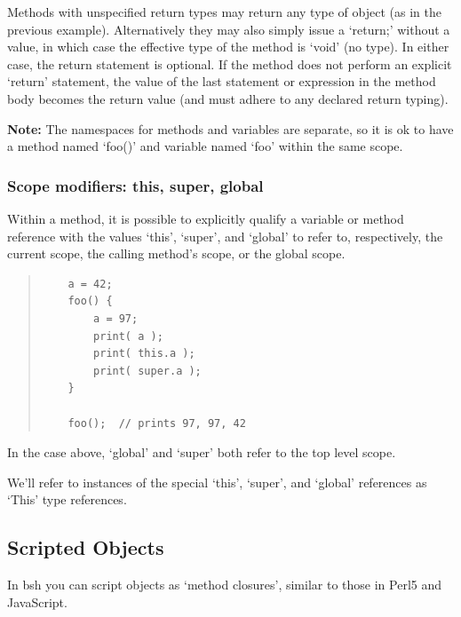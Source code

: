 \documentclass[twoside,11pt]{article}
\renewcommand{\_}{\texttt{\symbol{95}}}
\begin{document}
Methods with unspecified return types may return any type of object (as in
the previous example).
Alternatively they may also simply issue a `return;' without a value, in
which case the effective type of the method is `void' (no type).  In
either case, the return statement is optional.  If the method does not
perform an explicit `return' statement, the value of the last statement or
expression in the method body becomes the return value (and must adhere
to any declared return typing).

\textbf{Note:}
The namespaces for methods and variables are separate, so
it is ok to have a method named `foo()' and variable named `foo' within
the same scope.

\subsubsection{Scope modifiers: this, super, global}
Within a method, it is possible to explicitly qualify a variable or
method reference with the values `this', `super', and `global' to
refer to, respectively, the current scope, the calling method's scope,
or the global scope.
\begin{quote}
\begin{verbatim}
    a = 42;
    foo() {
        a = 97;
        print( a );
        print( this.a );
        print( super.a );
    }

    foo();  // prints 97, 97, 42
\end{verbatim}
\end{quote}
In the case above, `global' and `super' both refer to the top level scope.

We'll refer to instances of the special `this', `super', and `global'
references as `This' type references.

\subsection{Scripted Objects}

In bsh you can script objects as `method closures', similar to
those in Perl5 and JavaScript.
\end{document}
